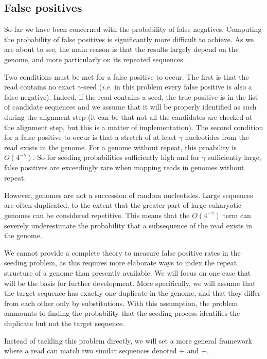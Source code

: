 \documentclass{article}
\begin{document}
\subsection{False positives}

So far we have been concerned with the probability of false negatives.
Computing the probability of false positives is significantly more
difficult to achieve. As we are about to see, the main reason is that the
results largely depend on the genome, and more particularly on its
repeated sequences.

Two conditions must be met for a false positive to occur. The first is
that the read contains no exact $\gamma$-seed (\textit{i.e.} in this
problem every false positive is also a false negative). Indeed, if the
read contains a seed, the true positive is in the list of candidate
sequences and we assume that it will be properly identified as such during
the alignment step (it can be that not all the candidates are checked at
the alignment step, but this is a matter of implementation). The second
condition for a false positive to occur is that a stretch of at least
$\gamma$ nucleotides from the read exists in the genome. For a genome
without repeat, this proability is $O(4^{-\gamma})$. So for seeding
probabilities sufficiently high and for $\gamma$ sufficiently large, false
positives are exceedingly rare when mapping reads in genomes without
repeat.

However, genomes are not a succession of random nucleotides. Large
sequences are often duplicated, to the extent that the greater part of
large eukaryotic genomes can be considered repetitive. This means that the
$O(4^{-\gamma})$ term can severely underestimate the probability
that a subsequence of the read exists in the genome.

We cannot provide a complete theory to measure false positive rates in the
seeding problem, as this requires more elaborate ways to index the repeat
structure of a genome than presently available. We will focus on one case
that will be the basis for further development. More specifically, we will
assume that the target sequence has exactly one duplicate in the genome,
and that they differ from each other only by substitutions. With this
assumption, the problem ammounts to finding the probability that the
seeding process identifies the duplicate but not the target sequence.

Instead of tackling this problem directly, we will set a more general
framework where a read can match two similar sequences denoted $+$ and
$-$.
\end{document}
